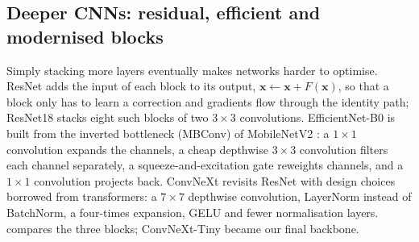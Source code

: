 \subsection{Deeper CNNs: residual, efficient and modernised blocks}
Simply stacking more layers eventually makes networks harder to optimise. ResNet \cite{he2016resnet} adds the input of each block to its output, $\bm{x}\leftarrow\bm{x}+F(\bm{x})$, so that a block only has to learn a correction and gradients flow through the identity path; ResNet18 stacks eight such blocks of two $3\times3$ convolutions. EfficientNet-B0 \cite{tan2019efficientnet} is built from the inverted bottleneck (MBConv) of MobileNetV2 \cite{sandler2018mobilenetv2}: a $1\times1$ convolution expands the channels, a cheap depthwise $3\times3$ convolution filters each channel separately, a squeeze-and-excitation gate \cite{hu2018senet} reweights channels, and a $1\times1$ convolution projects back. ConvNeXt \cite{liu2022convnext} revisits ResNet with design choices borrowed from transformers: a $7\times7$ depthwise convolution, LayerNorm instead of BatchNorm, a four-times expansion, GELU and fewer normalisation layers.  compares the three blocks; ConvNeXt-Tiny became our final backbone.

